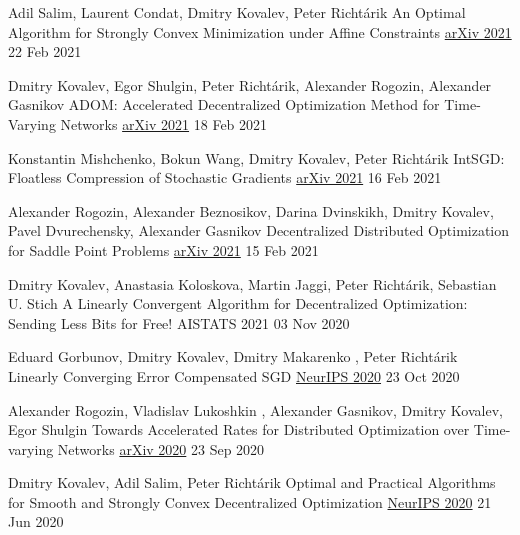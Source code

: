 
\begin{cventries}
	

\cventry
{Adil Salim, Laurent Condat, Dmitry Kovalev, Peter Richtárik} %
{An Optimal Algorithm for Strongly Convex Minimization under Affine Constraints} %
{\href{https://arxiv.org/abs/2102.11079}{arXiv 2021}} 
{22 Feb 2021} %
{}	

\cventry
{Dmitry Kovalev, Egor Shulgin, Peter Richtárik, Alexander Rogozin, Alexander Gasnikov} %
{ADOM: Accelerated Decentralized Optimization Method for Time-Varying Networks} %
{\href{https://arxiv.org/abs/2102.09234}{arXiv 2021}} 
{18 Feb 2021} %
{}	

\cventry
{Konstantin Mishchenko, Bokun Wang, Dmitry Kovalev, Peter Richtárik} %
{IntSGD: Floatless Compression of Stochastic Gradients} %
{\href{https://arxiv.org/abs/2102.08374}{arXiv 2021}} 
{16 Feb 2021} %
{}	

\cventry
{Alexander Rogozin, Alexander Beznosikov, Darina Dvinskikh, Dmitry Kovalev, Pavel Dvurechensky, Alexander Gasnikov} %
{Decentralized Distributed Optimization for Saddle Point Problems} %
{\href{https://arxiv.org/abs/2102.07758}{arXiv 2021}} 
{15 Feb 2021} %
{}	

\cventry
{Dmitry Kovalev, Anastasia Koloskova, Martin Jaggi, Peter Richtárik, Sebastian U. Stich} %
{A Linearly Convergent Algorithm for Decentralized Optimization: Sending Less Bits for Free!} %
{AISTATS 2021} 
{03 Nov 2020} %
{}	

\cventry
{Eduard Gorbunov, Dmitry Kovalev, Dmitry Makarenko , Peter Richtárik} %
{Linearly Converging Error Compensated SGD} %
{\href{https://papers.nips.cc/paper/2020/hash/ef9280fbc5317f17d480e4d4f61b3751-Abstract.html}{NeurIPS 2020}} 
{23 Oct 2020} %
{}	

\cventry
{Alexander Rogozin, Vladislav Lukoshkin , Alexander Gasnikov, Dmitry Kovalev, Egor Shulgin} %
{Towards Accelerated Rates for Distributed Optimization over Time-varying Networks} %
{\href{https://arxiv.org/abs/2009.11069}{arXiv 2020}} 
{23 Sep 2020} %
{}	

\cventry
{Dmitry Kovalev, Adil Salim, Peter Richtárik} %
{Optimal and Practical Algorithms for Smooth and Strongly Convex Decentralized Optimization} %
{\href{https://papers.nips.cc/paper/2020/hash/d530d454337fb09964237fecb4bea6ce-Abstract.html}{NeurIPS 2020}} 
{21 Jun 2020} %
{}	


\end{cventries}
